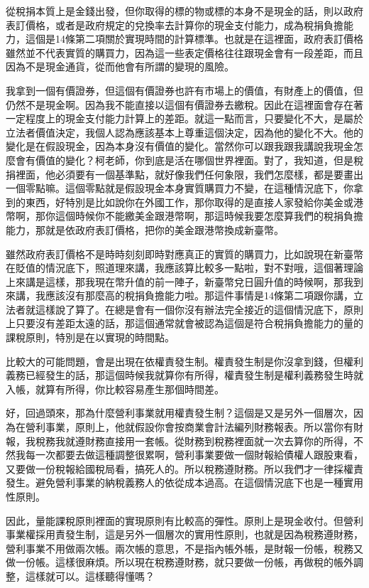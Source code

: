 \documentclass[]{ctexbook}
\begin{document}
從稅捐本質上是金錢出發，但你取得的標的物或標的本身不是現金的話，則以政府表訂價格，或者是政府規定的兌換率去計算你的現金支付能力，成為稅捐負擔能力，這個是14條第二項關於實現時間的計算標準。也就是在這裡面，政府表訂價格雖然並不代表實質的購買力，因為這一些表定價格往往跟現金會有一段差距，而且因為不是現金通貨，從而他會有所謂的變現的風險。

我拿到一個有價證券，但這個有價證券也許有市場上的價值，有財產上的價值，但仍然不是現金啊。因為我不能直接以這個有價證券去繳稅。因此在這裡面會存在著一定程度上的現金支付能力計算上的差距。就這一點而言，只要變化不大，是屬於立法者價值決定，我個人認為應該基本上尊重這個決定，因為他的變化不大。他的變化是在假設現金，因為本身沒有價值的變化。當然你可以跟我跟我講說我現金怎麼會有價值的變化？柯老師，你到底是活在哪個世界裡面。對了，我知道，但是稅捐裡面，他必須要有一個基準點，就好像我們任何象限，我們怎麼樣，都是要畫出一個零點嘛。這個零點就是假設現金本身實質購買力不變，在這種情況底下，你拿到的東西，好特別是比如說你在外國工作，那你取得的是直接人家發給你美金或港幣啊，那你這個時候你不能繳美金跟港幣啊，那這時候我要怎麼算我們的稅捐負擔能力，那就是依政府表訂價格，把你的美金跟港幣換成新臺幣。

雖然政府表訂價格不是時時刻刻即時對應真正的實質的購買力，比如說現在新臺幣在貶值的情況底下，照道理來講，我應該算比較多一點啦，對不對哦，這個著理論上來講是這樣，那我現在幣升值的前一陣子，新臺幣兌日圓升值的時候啊，那我到來講，我應該沒有那麼高的稅捐負擔能力啦。那這件事情是14條第二項跟你講，立法者就這樣說了算了。在總是會有一個你沒有辦法完全接近的這個情況底下，原則上只要沒有差距太遠的話，那這個通常就會被認為這個是符合稅捐負擔能力的量的課稅原則，特別是在以實現的時間點。

比較大的可能問題，會是出現在依權責發生制。權責發生制是你沒拿到錢，但權利義務已經發生的話，那這個時候我就算你有所得，權責發生制是權利義務發生時就入帳，就算有所得，你比較容易產生那個時間差。

好，回過頭來，那為什麼營利事業就用權責發生制？這個是又是另外一個層次，因為在營利事業，原則上，他就假設你會按商業會計法編列財務報表。所以當你有財報，我稅務我就遵財務直接用一套帳。從財務到稅務裡面就一次去算你的所得，不然我每一次都要去做這種調整很累啊，營利事業要做一個財報給債權人跟股東看，又要做一份稅報給國稅局看，搞死人的。所以稅務遵財務。所以我們才一律採權責發生。避免營利事業的納稅義務人的依從成本過高。在這個情況底下也是一種實用性原則。

因此，量能課稅原則裡面的實現原則有比較高的彈性。原則上是現金收付。但營利事業權採用責發生制，這是另外一個層次的實用性原則，也就是因為稅務遵財務，營利事業不用做兩次帳。兩次帳的意思，不是指內帳外帳，是財報一份帳，稅務又做一份帳。這樣很麻煩。所以現在稅務遵財務，就只要做一份帳，再做稅的帳外調整，這樣就可以。這樣聽得懂嗎？
\end{document}
